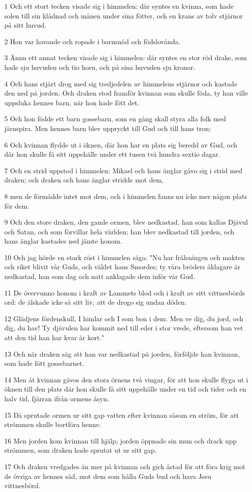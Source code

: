 \par 1 Och ett stort tecken visade sig i himmelen: där syntes en kvinna, som hade solen till sin klädnad och månen under sina fötter, och en krans av tolv stjärnor på sitt huvud.
\par 2 Hon var havande och ropade i barnsnöd och födslovånda.
\par 3 Ännu ett annat tecken visade sig i himmelen: där syntes en stor röd drake, som hade sju huvuden och tio horn, och på sina huvuden sju kronor.
\par 4 Och hans stjärt drog med sig tredjedelen av himmelens stjärnor och kastade den ned på jorden. Och draken stod framför kvinnan som skulle föda, ty han ville uppsluka hennes barn, när hon hade fött det.
\par 5 Och hon födde ett barn gossebarn, som en gång skall styra alla folk med järnspira. Men hennes barn blev uppryckt till Gud och till hans tron;
\par 6 Och kvinnan flydde ut i öknen, där hon har en plats sig beredd av Gud, och där hon skulle få sitt uppehälle under ett tusen två hundra sextio dagar.
\par 7 Och en strid uppstod i himmelen: Mikael och hans änglar gåvo sig i strid med draken; och draken och hans änglar stridde mot dem,
\par 8 men de förmådde intet mot dem, och i himmelen fanns nu icke mer någon plats för dem.
\par 9 Och den store draken, den gamle ormen, blev nedkastad, han som kallas Djävul och Satan, och som förvillar hela världen; han blev nedkastad till jorden, och hans änglar kastades ned jämte honom.
\par 10 Och jag hörde en stark röst i himmelen säga: "Nu har frälsningen och makten och riket blivit vår Guds, och väldet hans Smordes; ty våra bröders åklagare är nedkastad, han som dag och natt anklagade dem inför vår Gud.
\par 11 De övervunno honom i kraft av Lammets blod och i kraft av sitt vittnesbörds ord: de älskade icke så sitt liv, att de drogo sig undan döden.
\par 12 Glädjens fördenskull, I himlar och I som bon i dem. Men ve dig, du jord, och dig, du hav! Ty djävulen har kommit ned till eder i stor vrede, eftersom han vet att den tid han har kvar är kort."
\par 13 Och när draken såg att han var nedkastad på jorden, förföljde han kvinnan, som hade fött gossebarnet.
\par 14 Men åt kvinnan gåvos den stora örnens två vingar, för att hon skulle flyga ut i öknen till den plats där hon skulle få sitt uppehälle under en tid och tider och en halv tid, fjärran ifrån ormens åsyn.
\par 15 Då sprutade ormen ur sitt gap vatten efter kvinnan såsom en ström, för att strömmen skulle bortföra henne.
\par 16 Men jorden kom kvinnan till hjälp; jorden öppnade sin mun och drack upp strömmen, som draken hade sprutat ut ur sitt gap.
\par 17 Och draken vredgades än mer på kvinnan och gick åstad för att föra krig mot de övriga av hennes säd, mot dem som hålla Guds bud och hava Jesu vittnesbörd.

